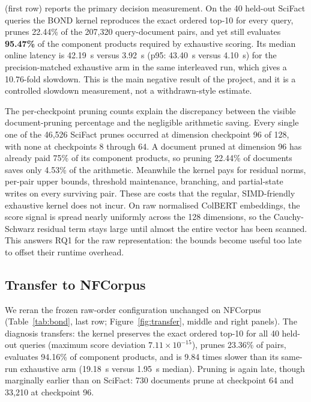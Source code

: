  (first row) reports the primary decision measurement. On the
40 held-out SciFact queries the BOND kernel reproduces the exact ordered
top-10 for every query, prunes 22.44\% of the 207{,}320 query-document pairs,
and yet still evaluates \textbf{95.47\%} of the component products required by
exhaustive scoring. Its median online latency is \SI{42.19}{\second} versus
\SI{3.92}{\second} (p95: \SI{43.40}{\second} versus \SI{4.10}{\second}) for
the precision-matched exhaustive arm in the same interleaved run, which gives 
a 10.76-fold slowdown. This is the main negative result of the project, and 
it is a controlled slowdown measurement, not a withdrawn-style estimate.

The per-checkpoint pruning counts explain the discrepancy between the 
visible document-pruning percentage and the negligible arithmetic saving. 
Every single one of the 46,526 SciFact prunes occurred at dimension checkpoint 96 of 128, 
with none at checkpoints 8 through 64. A document pruned at dimension 96 has already paid 
75\% of its component products, so pruning 22.44\% of documents saves only 4.53\% of the arithmetic. 
Meanwhile the kernel pays for residual norms, per-pair upper bounds, threshold maintenance, 
branching, and partial-state writes on every surviving pair. These are costs that the regular, 
SIMD-friendly exhaustive kernel does not incur. On raw normalised ColBERT embeddings, the score 
signal is spread nearly uniformly across the 128 dimensions, so the Cauchy-Schwarz residual term 
stays large until almost the entire vector has been scanned. This answers RQ1 for the raw representation: 
the bounds become useful too late to offset their runtime overhead.

\subsection{Transfer to NFCorpus}

We reran the frozen raw-order configuration unchanged on NFCorpus (Table~\ref{tab:bond}, 
last row; Figure~\ref{fig:transfer}, middle and right panels). The 
diagnosis transfers: the kernel preserves the exact ordered top-10 for all 40 held-out queries 
(maximum score deviation $7.11 \times 10^{-15}$), prunes 23.36\% of pairs, evaluates 94.16\% of 
component products, and is 9.84 times slower than its same-run exhaustive arm 
(\SI{19.18}{\second} versus \SI{1.95}{\second}  median). Pruning is 
again late, though marginally earlier than on SciFact: 
730 documents prune at checkpoint 64 and 33,210 at checkpoint 96.

